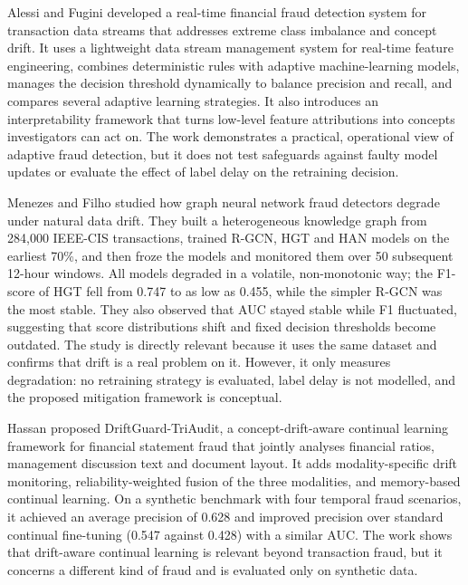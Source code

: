 Alessi and Fugini \cite{alessi2026} developed a real-time financial fraud detection system for transaction data streams that addresses extreme class imbalance and concept drift. It uses a lightweight data stream management system for real-time feature engineering, combines deterministic rules with adaptive machine-learning models, manages the decision threshold dynamically to balance precision and recall, and compares several adaptive learning strategies. It also introduces an interpretability framework that turns low-level feature attributions into concepts investigators can act on. The work demonstrates a practical, operational view of adaptive fraud detection, but it does not test safeguards against faulty model updates or evaluate the effect of label delay on the retraining decision.

Menezes and Filho \cite{menezes2025} studied how graph neural network fraud detectors degrade under natural data drift. They built a heterogeneous knowledge graph from 284,000 IEEE-CIS transactions, trained R-GCN, HGT and HAN models on the earliest 70\%, and then froze the models and monitored them over 50 subsequent 12-hour windows. All models degraded in a volatile, non-monotonic way; the F1-score of HGT fell from 0.747 to as low as 0.455, while the simpler R-GCN was the most stable. They also observed that AUC stayed stable while F1 fluctuated, suggesting that score distributions shift and fixed decision thresholds become outdated. The study is directly relevant because it uses the same dataset and confirms that drift is a real problem on it. However, it only measures degradation: no retraining strategy is evaluated, label delay is not modelled, and the proposed mitigation framework is conceptual.

Hassan \cite{hassan2026} proposed DriftGuard-TriAudit, a concept-drift-aware continual learning framework for financial statement fraud that jointly analyses financial ratios, management discussion text and document layout. It adds modality-specific drift monitoring, reliability-weighted fusion of the three modalities, and memory-based continual learning. On a synthetic benchmark with four temporal fraud scenarios, it achieved an average precision of 0.628 and improved precision over standard continual fine-tuning (0.547 against 0.428) with a similar AUC. The work shows that drift-aware continual learning is relevant beyond transaction fraud, but it concerns a different kind of fraud and is evaluated only on synthetic data.


